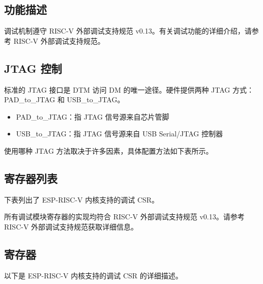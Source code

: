 \documentclass[main\_\_CN.tex]{subfiles}
\begin{document}
\subsection{功能描述}
\label{sec:riscvcpu-dbg-func-descr}

调试机制遵守 RISC-V 外部调试支持规范 v0.13。有关调试功能的详细介绍，请参考 RISC-V 外部调试支持规范。

\subsection{JTAG 控制}
\label{sec:riscvcpu-dbg-jtag-cntl}

标准的 JTAG 接口是 DTM 访问 DM 的唯一途径。硬件提供两种 JTAG 方式：PAD\_to\_JTAG 和 USB\_to\_JTAG。

\begin{itemize}
    \item {PAD\_to\_JTAG：指 JTAG 信号源来自芯片管脚}
    \item {USB\_to\_JTAG：指 JTAG 信号源来自 USB Serial/JTAG 控制器}
\end{itemize}

使用哪种 JTAG 方法取决于许多因素，具体配置方法如下表所示。




\hypertarget{riscvcpu-dbg-reg-summ}{}
\subsection{寄存器列表}
\label{sec:riscvcpu-dbg-reg-summ}


下表列出了 ESP-RISC-V 内核支持的调试 CSR。


所有调试模块寄存器的实现均符合 RISC-V 外部调试支持规范 v0.13。请参考 RISC-V 外部调试支持规范获取详细信息。



\subsection{寄存器}
以下是 ESP-RISC-V 内核支持的调试 CSR 的详细描述。



\end{document}
